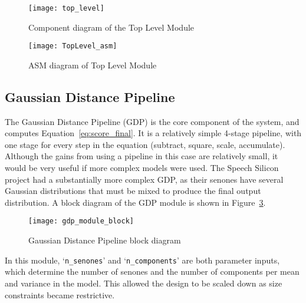 		\begin{figure}[tb]
			\begin{center}
				\texttt{[image: top\_level]}
			\end{center}
			\caption{Component diagram of the Top Level Module}
			\label{fig:toplevel}
		\end{figure}

		\begin{figure}[tb]
			\begin{center}
				\texttt{[image: TopLevel\_asm]}
			\end{center}
			\caption{ASM diagram of Top Level Module}
			\label{fig:topstatemachine}
		\end{figure}

	\subsection{Gaussian Distance Pipeline} %
	\label{sub:gaussian_distance_pipeline}
		The Gaussian Distance Pipeline (GDP) is the core component of the system, and computes Equation~\ref{eq:score_final}.  It is a relatively simple 4-stage pipeline, with one stage for every step in the equation (subtract, square, scale, accumulate).  Although the gains from using a pipeline in this case are relatively small, it would be very useful if more complex models were used.  The Speech Silicon \cite{schuster2006speech} project had a substantially more complex GDP, as their senones have several Gaussian distributions that must be mixed to produce the final output distribution.  A block diagram of the GDP module is shown in Figure~\ref{fig:gdp_block}.  %

		\begin{figure}[tb]
			\begin{center}
				\texttt{[image: gdp\_module\_block]}
			\end{center}
			\caption{Gaussian Distance Pipeline block diagram}
			\label{fig:gdp_block}
		\end{figure}

		In this module, `\texttt{n\_senones}' and `\texttt{n\_components}' are both parameter inputs, which determine the number of senones and the number of components per mean and variance in the model.  This allowed the design to be scaled down as size constraints became restrictive.

